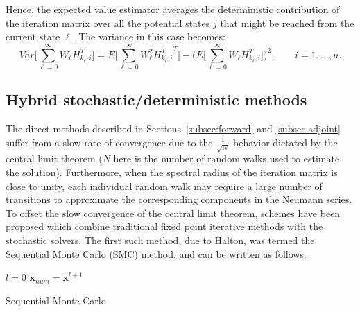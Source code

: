 \documentclass[final,leqno,onefignum,onetabnum]{siamltex1213}
\begin{document}
Hence, the expected value estimator averages
the deterministic contribution of the iteration matrix over all the potential
states $j$ that might be reached from the current state $\ell$. The variance
in this case becomes:
\begin{equation}
Var\bigg [\sum_{\ell=0}^\infty W_{\ell}
H_{k_{\ell},i}^T\bigg]=E\bigg[\sum_{\ell=0}^\infty W_{\ell}^2
{H_{k_{\ell},i}^T}^T\bigg ] - \bigg 
(E\bigg[\sum_{\ell=0}^\infty
W_{\ell}
H_{k_{\ell},i}^T\bigg]\bigg )^2, \qquad i=1,\ldots,n
\label{adj_var1}.
\end{equation}

\subsection{Hybrid stochastic/deterministic methods}

The direct methods described in Sections~\ref{subsec:forward} and
\ref{subsec:adjoint} suffer from a slow rate of convergence due to the
$\frac{1}{\sqrt{N}}$ behavior dictated by the central limit theorem ($N$ here
is the number of random walks used to estimate the solution).  Furthermore,
when the spectral radius of the iteration matrix is close to unity, each
individual random walk may require a large number of transitions to
approximate the corresponding components in the Neumann series.
To offset the slow convergence of the central limit theorem, schemes have
been proposed which combine traditional fixed point iterative methods with
the stochastic solvers.  The first such method, due to Halton, was termed
the Sequential Monte Carlo (SMC) method, and can be written as follows.

\begin{algorithm}[H]
 \LinesNumbered
 $l=0$\;
 $\mathbf{x}_{num}=\mathbf{x}^{l+1}$\;
 \caption{Sequential Monte Carlo}
\end{algorithm}
\end{document}
